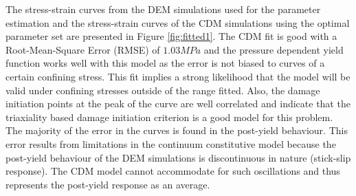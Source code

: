 The stress-strain curves from the DEM simulations used for the parameter estimation and the stress-strain curves of the CDM simulations using the optimal parameter set are presented in Figure \ref{fig:fitted1}. The CDM fit is good with a Root-Mean-Square Error (RMSE) of $1.03MPa$ and the pressure dependent yield function works well with this model as the error is not biased to curves of a certain confining stress. This fit implies a strong likelihood that the model will be valid under confining stresses outside of the range fitted. Also, the damage initiation points at the peak of the curve are well correlated and indicate that the triaxiality based damage initiation criterion is a good model for this problem. The majority of the error in the curves is found in the post-yield behaviour. This error results from limitations in the continuum constitutive model because the post-yield behaviour of the DEM simulations is discontinuous in nature (stick-slip response). The CDM model cannot accommodate for such oscillations and thus represents the post-yield response as an average. 
